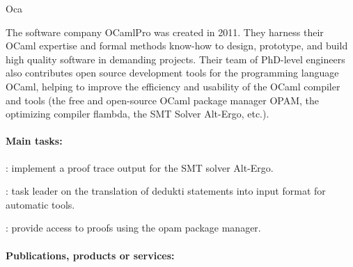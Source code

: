 \begin{sitedescription}{Oca}



The software company OCamlPro was created in 2011. They harness their OCaml expertise and formal methods know-how to design, prototype, and build high quality software in demanding projects. Their team of PhD-level engineers also contributes open source development tools for the programming language OCaml, helping to improve the efficiency and usability of the OCaml compiler and tools (the free and open-source OCaml package manager OPAM, the optimizing compiler flambda, the SMT Solver Alt-Ergo, etc.).

\paragraph{Main tasks:}


\begin{compactitem}
\item {}: implement a proof trace output for the SMT solver Alt-Ergo.
\item {}: task leader on the translation of dedukti statements into input format for automatic tools.
\item {}: provide access to proofs using the opam package manager.
\end{compactitem}

\paragraph{Publications, products or services:}



\end{sitedescription}
